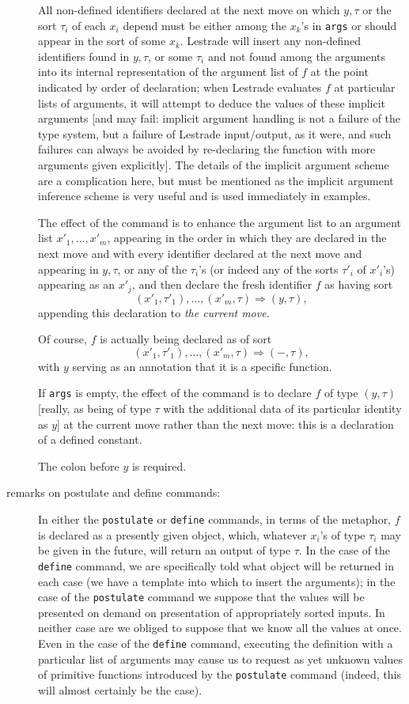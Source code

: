 \documentclass[12pt]{article}
\begin{document}
\begin{description}
All non-defined identifiers declared at the next move on which $y, \tau$ or the sort $\tau_i$ of each $x_i$ depend must be either among the $x_k$'s in {\tt args} or should appear in the sort of some $x_k$.  Lestrade will insert any non-defined identifiers found in $y,\tau$, or some $\tau_i$ and not found among the arguments into its internal representation of the argument list of $f$ at the point indicated by order of declaration;  when Lestrade evaluates $f$ at particular lists of arguments, it will attempt to deduce the values of these implicit arguments [and may fail:  implicit argument handling is not a failure of the type system, but a failure of Lestrade input/output, as it were, and such failures can always be avoided by re-declaring the function with more arguments given explicitly].  The details of the implicit argument scheme are a complication here, but must be mentioned as the implicit argument inference scheme is very useful and is used immediately in examples.

  The effect of the command is to enhance the argument list
to an argument list $x'_1,\ldots,x'_m$, appearing in the order in which they are declared in the next move and with every identifier declared at the next
move and appearing in $y, \tau$, or any of the $\tau_i$'s (or indeed any of the sorts $\tau'_i$ of $x'_i$'s) appearing as an $x'_j$, and then declare the fresh identifier $f$
as having sort $$(x'_1,\tau'_1),\ldots,(x'_m,\tau)\Rightarrow (y,\tau),$$ appending this declaration to {\em the current move\/}.  

Of course, $f$ is actually being declared as of sort  $$(x'_1,\tau'_1),\ldots,(x'_m,\tau)\Rightarrow (-,\tau),$$ with $y$ serving as an annotation that it is a specific function.

If {\tt args} is empty, the effect of the command is to declare $f$ of type $(y,\tau)$ [really, as being of type $\tau$ with the additional data of its particular identity as $y$] at the current move rather than the next move:  this is a declaration of a defined constant.  

The colon before $y$ is required.

\item[remarks on postulate and define commands:]  In either the {\tt postulate} or {\tt define} commands, in terms of the metaphor,
$f$ is declared as a presently given object, which, whatever $x_i$'s of type $\tau_i$ may be given in the future, will return an output of type $\tau$.  In the case of the {\tt define} command, we are specifically told what object will be returned in each case (we have a template into which to insert the arguments);  in the case of the {\tt postulate} command we suppose that the values will be presented on demand on presentation of appropriately sorted inputs.  In neither case are we obliged to suppose that we know all the values at once.  Even in the case of the {\tt define} command, executing the definition with a particular list of arguments may cause us to request as yet unknown values of primitive functions introduced by the {\tt postulate} command (indeed, this will almost certainly be the case).  


\end{description}
\end{document}

